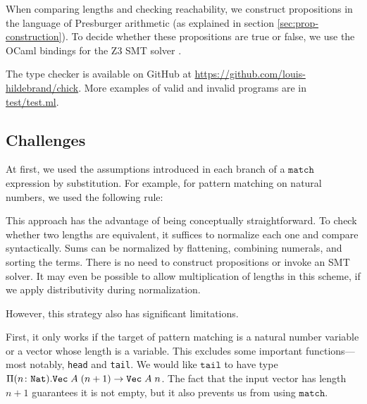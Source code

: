 \documentclass[acmsmall,nonacm]{acmart}
\newcommand{\githuburl}{\url{https://github.com/louis-hildebrand/chick}}
\begin{document}
When comparing lengths and checking reachability, we construct propositions in the language of Presburger arithmetic (as explained in section \ref{sec:prop-construction}).
To decide whether these propositions are true or false, we use the OCaml bindings for the Z3 SMT solver \cite{z3, z3-ocaml}.

The type checker is available on GitHub at \githuburl.
More examples of valid and invalid programs are in \href{https://github.com/louis-hildebrand/chick/blob/main/test/test.ml}{test/test.ml}.

\subsection{Challenges}
\label{sec:challenges}

At first, we used the assumptions introduced in each branch of a $\texttt{match}$ expression by substitution.
For example, for pattern matching on natural numbers, we used the following rule:
\begin{inferences}
\end{inferences}

\noindent
This approach has the advantage of being conceptually straightforward.
To check whether two lengths are equivalent, it suffices to normalize each one and compare syntactically.
Sums can be normalized by flattening, combining numerals, and sorting the terms.
There is no need to construct propositions or invoke an SMT solver.
It may even be possible to allow multiplication of lengths in this scheme, if we apply distributivity during normalization.

However, this strategy also has significant limitations.

First, it only works if the target of pattern matching is a natural number variable or a vector whose length is a variable.
This excludes some important functions---most notably, \texttt{head} and \texttt{tail}.
We would like $\texttt{tail}$ to have type $\Pi (n \colon \texttt{Nat}) . \texttt{Vec} \; A \; (n+1) \rightarrow \texttt{Vec} \; A \; n$.
The fact that the input vector has length $n + 1$ guarantees it is not empty, but it also prevents us from using $\texttt{match}$.
\end{document}
